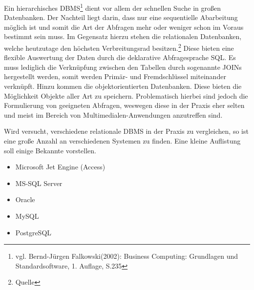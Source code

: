 Ein hierarchisches DBMS\footnote{vgl. Bernd-Jürgen Falkowski(2002): Business Computing: Grundlagen und Standardsoftware, 1. Auflage, S.235} dient vor allem der schnellen Suche in großen Datenbanken.
Der Nachteil liegt darin, dass nur eine sequentielle Abarbeitung möglich ist und somit die Art der Abfragen mehr oder weniger schon im Voraus bestimmt sein muss.
Im Gegensatz hierzu stehen die relationalen Datenbanken, welche heutzutage den höchsten Verbreitungsrad besitzen.\footnote{Quelle}
Diese bieten eine flexible Auswertung der Daten durch die deklarative Abfragesprache SQL.
Es muss lediglich die Verknüpfung zwischen den Tabellen durch sogenannte JOINs hergestellt werden, somit werden Primär- und Fremdschlüssel miteinander verknüpft.
Hinzu kommen die objektorientierten Datenbanken. Diese bieten die Möglichkeit Objekte aller Art zu speichern.
Problematisch hierbei sind jedoch die Formulierung von geeigneten Abfragen, weswegen diese in der Praxis eher selten und meist im Bereich von Multimedialen-Anwendungen anzutreffen sind.%

Wird versucht, verschiedene relationale DBMS in der Praxis zu vergleichen, so ist eine große Anzahl an verschiedenen Systemen zu finden.
Eine kleine Auflistung soll einige Bekannte vorstellen.

\begin{itemize}
\item Microsoft Jet Engine (Access)
\item MS-SQL Server
\item Oracle
\item MySQL
\item PostgreSQL
\end{itemize}

